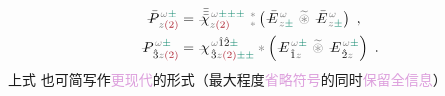\begin{subequations} \label{eq:DP^(2)-plane_wave_basis-pm_pmpm}
\begin{align}
	\Xint{\mathcolor{gray}{-}}{30}{\bar{P}}^{\;\! \mathcolor{gray}{\omega} \textcolor{PineGreen}{\pm}}_{\;\! \mathcolor{gray}{z} \textcolor{Maroon}{(2)}} &= \Xint{{}^{}_{\mathcolor{gray}{-}}}{23}{\bar{\bar{\bar{\chi}}}}^{\;\! \mathcolor{gray}{\omega} \textcolor{PineGreen}{\pm \pm \pm}}_{\mathcolor{gray}{z} \textcolor{Maroon}{(2)}} ~{}^{\mathcolor{gray}{*}}_{\mathcolor{gray}{*}} \left( \Xint{\mathcolor{gray}{-}}{295}{\bar{E}}^{\;\!\mathcolor{gray}{\omega}}_{\;\! \mathcolor{gray}{z} \textcolor{PineGreen}{\pm} } ~\mathcolor{gray}{\widetilde \circledast}~ \Xint{\mathcolor{gray}{-}}{295}{\bar{E}}^{\;\!\mathcolor{gray}{\omega}}_{\;\! \mathcolor{gray}{z} \textcolor{PineGreen}{\pm} } \right) ~, \label{eq:vec-DP^(2)-plane_wave_basis-pm_pmpm} \\
	\Xint{\mathcolor{gray}{-}}{30}{P}^{\;\! \mathcolor{gray}{\omega} \textcolor{PineGreen}{\pm}}_{\;\! \hat{3}\mathcolor{gray}{z} \textcolor{Maroon}{(2)}} &= \Xint{{}^{}_{\mathcolor{gray}{-}}}{23}{\chi}^{\;\! \mathcolor{gray}{\omega} \hat{1} \hat{2} \textcolor{PineGreen}{\pm}}_{\;\! \hat{3} \mathcolor{gray}{z} \textcolor{Maroon}{(2)} \textcolor{PineGreen}{\pm \pm}} \mathcolor{gray}{*} \left( \Xint{\mathcolor{gray}{-}}{295}{E}^{\;\!\mathcolor{gray}{\omega} \textcolor{PineGreen}{\pm}}_{\;\! \hat{1} \mathcolor{gray}{z}} ~\mathcolor{gray}{\widetilde \circledast}~ \Xint{\mathcolor{gray}{-}}{295}{E}^{\;\!\mathcolor{gray}{\omega} \textcolor{PineGreen}{\pm}}_{\;\! \hat{2} \mathcolor{gray}{z}} \right) ~. \label{eq:components-DP^(2)-plane_wave_basis-pm_pmpm}
\end{align}
\end{subequations}
上式  也可简写作\textcolor{Plum}{更现代}的形式（最大程度\textcolor{Plum}{省略符号}的同时\textcolor{Plum}{保留全信息}）
